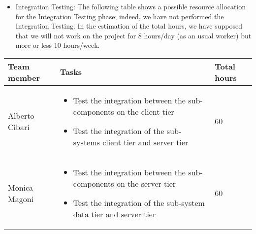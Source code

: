 \newpage
\begin{itemize}
    \item Integration Testing: 
    \newline The following table shows a possible resource allocation for the Integration Testing phase; indeed, we have not performed the Integration Testing.
    \newline
    In the estimation of the total hours, we have supposed that we will not work on the project for 8 hours/day (as an usual worker) but more or less 10 hours/week.
\end{itemize}
\begin{table}[H]
    \centering
    \begin{tabular}{|l|p{8cm}|l|}
        \hline
        \textbf{Team member} & \textbf{Tasks} & \textbf{Total hours}\\
        \hline
        Alberto Cibari & \begin{itemize}
            \item Test the integration between the sub-components on the client tier
            \item Test the integration of the sub-systems client tier and server tier
        \end{itemize} & 60\\
        \hline
        Monica Magoni & \begin{itemize}
            \item Test the integration between the sub-components on the server tier 
            \item Test the integration of the sub-system data tier and server tier
        \end{itemize} & 60\\
        \hline
    \end{tabular}
\end{table}